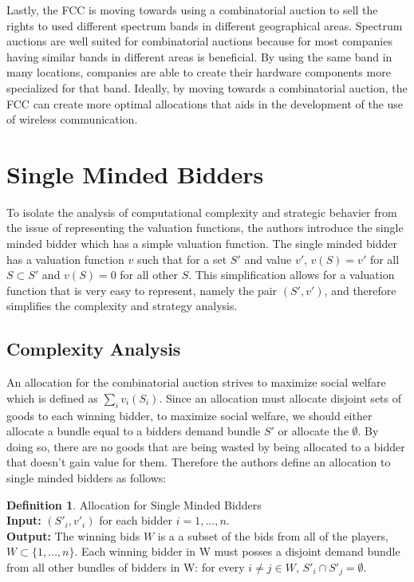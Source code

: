 \documentclass[10pt,onecolumn,letterpaper]{article}
\theoremstyle{definition}
\newtheorem{definition}{Definition}[section]
\begin{document}
Lastly, the FCC is moving towards using a combinatorial auction to sell the rights to used different spectrum bands in different geographical areas. Spectrum auctions are well suited for combinatorial auctions because for most companies having similar bands in different areas is beneficial. By using the same band in many locations, companies are able to create their hardware components more specialized for that band. Ideally, by moving towards a combinatorial auction, the FCC can create more optimal allocations that aids in the development of the use of wireless communication.

\section{Single Minded Bidders}

To isolate the analysis of computational complexity and strategic behavier from the issue of representing the valuation functions, the authors introduce the single minded bidder which has a simple valuation function. The single minded bidder has a valuation function $v$ such that for a set $S'$ and value $v'$, $v(S) = v'$ for all $S \subset S'$ and $v(S) = 0$ for all other $S$. This simplification allows for a valuation function that is very easy to represent, namely the pair $(S', v')$, and therefore simplifies the complexity and strategy analysis.

\subsection{Complexity Analysis}
An allocation for the combinatorial auction strives to maximize social welfare which is defined as $\sum_i v_i(S_i)$. Since an allocation must allocate disjoint sets of goods to each winning bidder, to maximize social welfare, we should either allocate a bundle equal to a bidders demand bundle $S'$ or allocate the $\emptyset$. By doing so, there are no goods that are being wasted by being allocated to a bidder that doesn't gain value for them. Therefore the authors define an allocation to single minded bidders as follows:

\theoremstyle{definition}
\begin{definition}{Allocation for Single Minded Bidders}
\\
\textbf{Input:} $(S'_i,v'_i)$ for each bidder $i = 1,...,n$.
\\
\textbf{Output:} The winning bids $W$ is a a subset of the bids from all of the players, $W \subset \{1,...,n\}$. Each winning bidder in W must posses a disjoint demand bundle from all other bundles of bidders in W: for every $i \neq j \in W$, $S'_i \cap S'_j = \emptyset$.
\end{definition}
\end{document}
